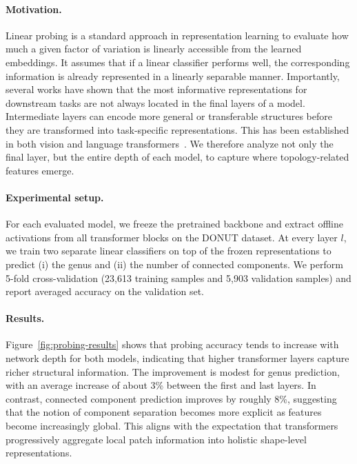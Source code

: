 \paragraph{Motivation.}
Linear probing is a standard approach in representation learning to evaluate how much a given factor of variation is linearly accessible from the learned embeddings. It assumes that if a linear classifier performs well, the corresponding information is already represented in a linearly separable manner. Importantly, several works have shown that the most informative representations for downstream tasks are not always located in the final layers of a model. Intermediate layers can encode more general or transferable structures before they are transformed into task-specific representations. This has been established in both vision and language transformers~\cite{intermediate_layers, structural_probe, vit_probing}. We therefore analyze not only the final layer, but the entire depth of each model, to capture where topology-related features emerge.

\paragraph{Experimental setup.}
For each evaluated model, we freeze the pretrained backbone and extract offline activations from all transformer blocks on the DONUT dataset. At every layer $l$, we train two separate linear classifiers on top of the frozen representations to predict (i) the genus and (ii) the number of connected components. We perform 5-fold cross-validation (23,613 training samples and 5,903 validation samples) and report averaged accuracy on the validation set.

\paragraph{Results.}
Figure~\ref{fig:probing-results} shows that probing accuracy tends to increase with network depth for both models, indicating that higher transformer layers capture richer structural information. The improvement is modest for genus prediction, with an average increase of about 3\% between the first and last layers. In contrast, connected component prediction improves by roughly 8\%, suggesting that the notion of component separation becomes more explicit as features become increasingly global. This aligns with the expectation that transformers progressively aggregate local patch information into holistic shape-level representations.

